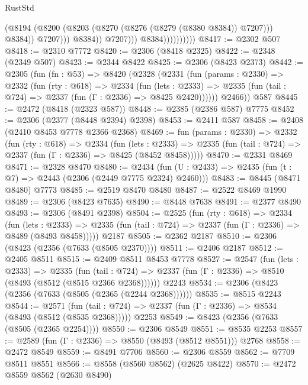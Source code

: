 \begin{lexlean}{RustStd}
\begin{coremodule}
                                        (@8194
                                          (@8200
                                            (@8203 (@8270 (@8276 (@8279 (@8380 @8384)) @7207)))
                                            @8384))
                                        @7207)))
                                  @8384))
                              @7207)))
                        @8384))))))))))
@8417 := @2302 @507
@8418 := @2310 @7772
@8420 := @2306 (@8418 @2325)
@8422 := @2348 (@2349 @507)
@8423 := @2344 @8422
@8425 := @2306 (@8423 @2373)
@8442 := @2305
    (fun (fn : @53) =>
    @8420
      (@2328
        (@2331
          (fun (params : @2330) =>
          @2332
            (fun (rty : @618) =>
            @2334
              (fun (lets : @2333) =>
              @2335 (fun (tail : @724) => @2337 (fun (Γ : @2336) => @8425 @2420))))))
        @2466))
    @587
@8445 := @2472 (@8418 (@2323 @587))
@8448 := @2385 (@2386 @587) @7775
@8452 := @2306 (@2377 (@8448 @2394) @2398)
@8453 := @2411 @587
@8458 := @2408 (@2410 @8453 @7778 @2366 @2368)
@8469 := fun (params : @2330) =>
  @2332
    (fun (rty : @618) =>
    @2334
      (fun (lets : @2333) =>
      @2335 (fun (tail : @724) => @2337 (fun (Γ : @2336) => @8425 (@8452 @8458)))))
@8470 := @2331 @8469
@8471 := @2328 @8470
@8480 := @2434 (fun (U : @2433) => @2435 (fun (t : @7) => @2443 (@2306 (@2449 @7775 @2324) @2460)))
@8483 := @8445 (@8471 @8480) @7773
@8485 := @2519 @8470 @8480
@8487 := @2522 @8469 @1990
@8489 := @2306 (@8423 @7635)
@8490 := @8448 @7638
@8491 := @2377 @8490
@8493 := @2306 (@8491 @2398)
@8504 := @2525
    (fun (rty : @618) =>
    @2334
      (fun (lets : @2333) =>
      @2335 (fun (tail : @724) => @2337 (fun (Γ : @2336) => @8489 (@8493 @8458)))))
    @2187
@8505 := @2362 @2187
@8510 := @2306 (@8423 (@2356 (@7633 (@8505 @2370))))
@8511 := @2406 @2187
@8512 := @2405 @8511
@8515 := @2409 @8511 @8453 @7778
@8527 := @2547
    (fun (lets : @2333) =>
    @2335
      (fun (tail : @724) => @2337 (fun (Γ : @2336) => @8510 (@8493 (@8512 (@8515 @2366 @2368))))))
    @2243
@8534 := @2306 (@8423 (@2356 (@7633 (@8505 (@2365 (@2244 @2368))))))
@8535 := @8515 @2243
@8544 := @2571
    (fun (tail : @724) => @2337 (fun (Γ : @2336) => @8534 (@8493 (@8512 (@8535 @2368)))))
    @2253
@8549 := @8423 (@2356 (@7633 (@8505 (@2365 @2254))))
@8550 := @2306 @8549
@8551 := @8535 @2253
@8557 := @2589 (fun (Γ : @2336) => @8550 (@8493 (@8512 @8551))) @2768
@8558 := @2472 @8549
@8559 := @8491 @7706
@8560 := @2306 @8559
@8562 := @7709 @8511 @8551
@8566 := @8558 (@8560 @8562) (@2625 @8422)
@8570 := @2472 @8559 @8562 (@2630 @8490)

\end{coremodule}
\end{lexlean}

